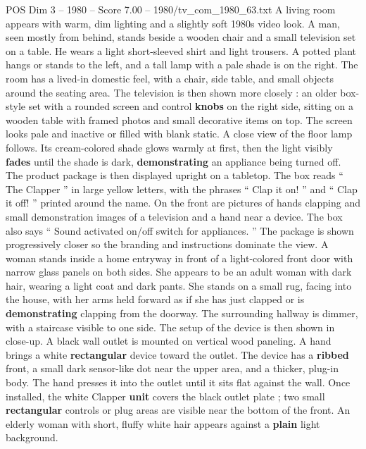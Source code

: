 \begin{textsample}{POS Dim 3 – 1980 – Score 7.00 – 1980/tv\_com\_1980\_63.txt}  \label{ex:f3_pos_050}
A living room appears with warm, dim lighting and a slightly soft 1980s video look.
A man, seen mostly from behind, stands beside a wooden chair and a small television set on a table.
He wears a light short-sleeved shirt and light trousers.
A potted plant hangs or stands to the left, and a tall lamp with a pale shade is on the right.
The room has a lived-in domestic feel, with a chair, side table, and small objects around the seating area.
The television is then shown more closely : an older box-style set with a rounded screen and control \textbf{knobs} on the right side, sitting on a wooden table with framed photos and small decorative items on top.
The screen looks pale and inactive or filled with blank static.
A close view of the floor lamp follows.
Its cream-colored shade glows warmly at first, then the light visibly \textbf{fades} until the shade is dark, \textbf{demonstrating} an appliance being turned off.
The product package is then displayed upright on a tabletop.
The box reads “ The Clapper ” in large yellow letters, with the phrases “ Clap it on! ” and “ Clap it off! ” printed around the name.
On the front are pictures of hands clapping and small demonstration images of a television and a hand near a device.
The box also says “ Sound activated on/off switch for appliances. ” The package is shown progressively closer so the branding and instructions dominate the view.
A woman stands inside a home entryway in front of a light-colored front door with narrow glass panels on both sides.
She appears to be an adult woman with dark hair, wearing a light coat and dark pants.
She stands on a small rug, facing into the house, with her arms held forward as if she has just clapped or is \textbf{demonstrating} clapping from the doorway.
The surrounding hallway is dimmer, with a staircase visible to one side.
The setup of the device is then shown in close-up.
A black wall outlet is mounted on vertical wood paneling.
A hand brings a white \textbf{rectangular} device toward the outlet.
The device has a \textbf{ribbed} front, a small dark sensor-like dot near the upper area, and a thicker, plug-in body.
The hand presses it into the outlet until it sits flat against the wall.
Once installed, the white Clapper \textbf{unit} covers the black outlet plate ; two small \textbf{rectangular} controls or plug areas are visible near the bottom of the front.
An elderly woman with short, fluffy white hair appears against a \textbf{plain} light background.

\end{textsample}
